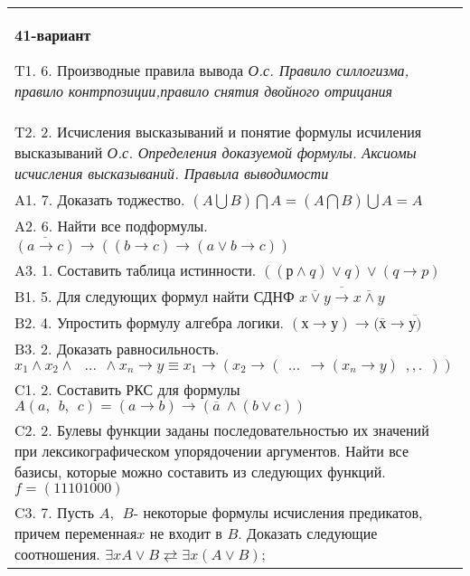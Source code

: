 \documentclass{article}
\begin{document}
\begin{tabular}{m{17cm}}
\textbf{41-вариант}
\newline

T1. 6. Производные правила вывода \emph{О.с. Правило силлогизма, правило контрпозиции,правило снятия двойного отрицания} \\
T2. 2. Исчисления высказываний и понятие формулы исчиления высказываний \emph{О.с. Определения доказуемой формулы. Аксиомы исчисления высказываний. Правыла выводимости} \\
A1. 7. Доказать тоджество. \((A\bigcup B)\bigcap A = (A\bigcap B)\bigcup A = A\) \\
A2. 6. Найти все подформулы. \(\overline{(a \rightarrow c)} \rightarrow \left( (b \rightarrow c) \rightarrow (a \vee b \rightarrow c) \right)\) \\
A3. 1. Составить таблица истинности. \(\left( (р \land q) \vee q \right) \vee (q \rightarrow p)\) \\
B1. 5. Для следующих формул найти СДНФ \(\overline{\overline{x \vee y} \rightarrow \overline{x \land y}}\) \\
B2. 4. Упростить формулу алгебра логики. \((х \rightarrow у) \rightarrow (\overline{х} \rightarrow \overline{у)}\) \\
B3. 2. Доказать равносильность.\(x_{1} \land x_{2} \land \ \ \ ...\ \  \land x_{n} \rightarrow y \equiv x_{1} \rightarrow (x_{2} \rightarrow (\ \ ...\ \  \rightarrow (x_{n} \rightarrow y)\ \ ,,.\ \ ))\) \\
C1. 2. Составить РКС для формулы \(A(a,\ \ b,\ \ c) = (a \rightarrow b) \rightarrow (\overline{a}\  \land (b \vee c))\) \\
C2. 2. Булевы функции заданы последовательностью их значений при лексикографическом упорядочении аргументов. Найти все базисы, которые можно составить из следующих функций. \(f = (11101000)\) \\
C3. 7. Пусть \(A,\ \ B\)- некоторые формулы исчисления предикатов, причем переменная\(x\) не входит в \(B\). Доказать следующие соотношения. \(\exists xA \vee B \rightleftarrows \exists x(A \vee B)\); \\

\end{tabular}
\vspace{1cm}
\end{document}
